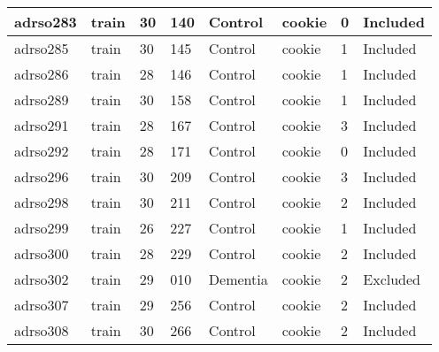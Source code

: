 \begin{center}
\begin{longtable}{|l|l|l|l|l|l|l|l|}
adrso283       & train                 & 30              & 140                & Control              & cookie          & 0                & Included      \\ \hline
adrso285       & train                 & 30              & 145                & Control              & cookie          & 1                & Included      \\ \hline
adrso286       & train                 & 28              & 146                & Control              & cookie          & 1                & Included      \\ \hline
adrso289       & train                 & 30              & 158                & Control              & cookie          & 1                & Included      \\ \hline
adrso291       & train                 & 28              & 167                & Control              & cookie          & 3                & Included      \\ \hline
adrso292       & train                 & 28              & 171                & Control              & cookie          & 0                & Included      \\ \hline
adrso296       & train                 & 30              & 209                & Control              & cookie          & 3                & Included      \\ \hline
adrso298       & train                 & 30              & 211                & Control              & cookie          & 2                & Included      \\ \hline
adrso299       & train                 & 26              & 227                & Control              & cookie          & 1                & Included      \\ \hline
adrso300       & train                 & 28              & 229                & Control              & cookie          & 2                & Included      \\ \hline
adrso302       & train                 & 29              & 010                & Dementia             & cookie          & 2                & Excluded      \\ \hline
adrso307       & train                 & 29              & 256                & Control              & cookie          & 2                & Included      \\ \hline
adrso308       & train                 & 30              & 266                & Control              & cookie          & 2                & Included      \\ \hline

\end{longtable}
\end{center}
